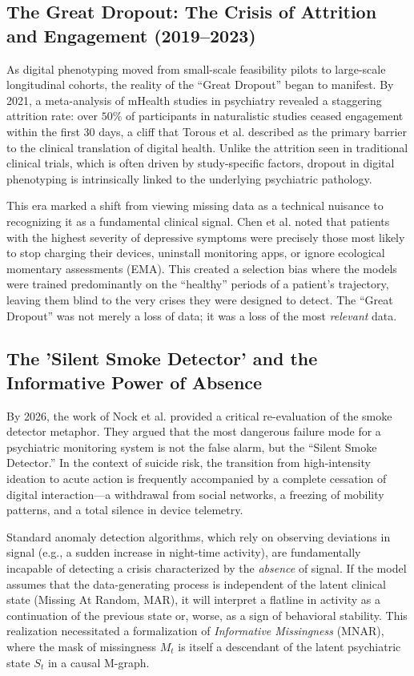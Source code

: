 \subsection{The Great Dropout: The Crisis of Attrition and Engagement (2019–2023)}
As digital phenotyping moved from small-scale feasibility pilots to large-scale longitudinal cohorts, the reality of the ``Great Dropout'' began to manifest. By 2021, a meta-analysis of mHealth studies in psychiatry revealed a staggering attrition rate: over $50\%$ of participants in naturalistic studies ceased engagement within the first 30 days, a cliff that Torous et al. \cite{torous2021growing} described as the primary barrier to the clinical translation of digital health. Unlike the attrition seen in traditional clinical trials, which is often driven by study-specific factors, dropout in digital phenotyping is intrinsically linked to the underlying psychiatric pathology.

This era marked a shift from viewing missing data as a technical nuisance to recognizing it as a fundamental clinical signal. Chen et al. \cite{chen2022attrition} noted that patients with the highest severity of depressive symptoms were precisely those most likely to stop charging their devices, uninstall monitoring apps, or ignore ecological momentary assessments (EMA). This created a selection bias where the models were trained predominantly on the ``healthy'' periods of a patient's trajectory, leaving them blind to the very crises they were designed to detect. The ``Great Dropout'' was not merely a loss of data; it was a loss of the most \textit{relevant} data.

\subsection{The 'Silent Smoke Detector' and the Informative Power of Absence}
By 2026, the work of Nock et al. \cite{nock2026predicting} provided a critical re-evaluation of the smoke detector metaphor. They argued that the most dangerous failure mode for a psychiatric monitoring system is not the false alarm, but the ``Silent Smoke Detector.'' In the context of suicide risk, the transition from high-intensity ideation to acute action is frequently accompanied by a complete cessation of digital interaction—a withdrawal from social networks, a freezing of mobility patterns, and a total silence in device telemetry.

Standard anomaly detection algorithms, which rely on observing deviations in signal (e.g., a sudden increase in night-time activity), are fundamentally incapable of detecting a crisis characterized by the \textit{absence} of signal. If the model assumes that the data-generating process is independent of the latent clinical state (Missing At Random, MAR), it will interpret a flatline in activity as a continuation of the previous state or, worse, as a sign of behavioral stability. This realization necessitated a formalization of \textit{Informative Missingness} (MNAR), where the mask of missingness $M_t$ is itself a descendant of the latent psychiatric state $S_t$ in a causal M-graph.

